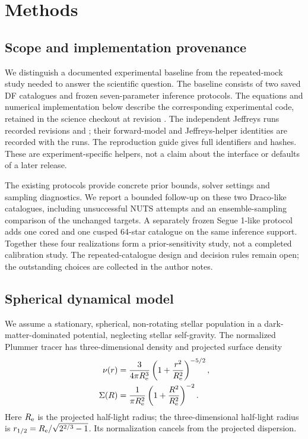 \section{Methods}
\label{sec:methods}

\subsection{Scope and implementation provenance}
\label{sec:scope}
We distinguish a documented experimental baseline from the repeated-mock study needed to answer the scientific question. The baseline consists of two saved DF catalogues and frozen seven-parameter inference protocols. The equations and numerical implementation below describe the corresponding experimental code, retained in the science checkout at revision . The independent Jeffreys runs recorded revisions  and ; their forward-model and Jeffreys-helper identities are recorded with the runs. The reproduction guide gives full identifiers and hashes. These are experiment-specific helpers, not a claim about the interface or defaults of a later \JeansPy{} release.

The existing protocols provide concrete prior bounds, solver settings and sampling diagnostics. We report a bounded follow-up on these two Draco-like catalogues, including unsuccessful NUTS attempts and an ensemble-sampling comparison of the unchanged targets. A separately frozen Segue 1-like protocol adds one cored and one cusped 64-star catalogue on the same inference support. Together these four realizations form a prior-sensitivity study, not a completed calibration study. The repeated-catalogue design and decision rules remain open; the outstanding choices are collected in the author notes.

\subsection{Spherical dynamical model}
\label{sec:model}
We assume a stationary, spherical, non-rotating stellar population in a dark-matter-dominated potential, neglecting stellar self-gravity. The normalized Plummer tracer \citep{plummer1911} has three-dimensional density and projected surface density
\begin{align}
 \nu(r)&=\frac{3}{4\pi R_{\rm e}^{3}}
            \left(1+\frac{r^2}{R_{\rm e}^{2}}\right)^{-5/2},\\
 \Sigma(R)&=\frac{1}{\pi R_{\rm e}^{2}}
            \left(1+\frac{R^2}{R_{\rm e}^{2}}\right)^{-2}.
 \label{eq:plummer}
\end{align}
Here $R_{\rm e}$ is the projected half-light radius; the three-dimensional half-light radius is $r_{1/2}=R_{\rm e}/\sqrt{2^{2/3}-1}$. Its normalization cancels from the projected dispersion.

